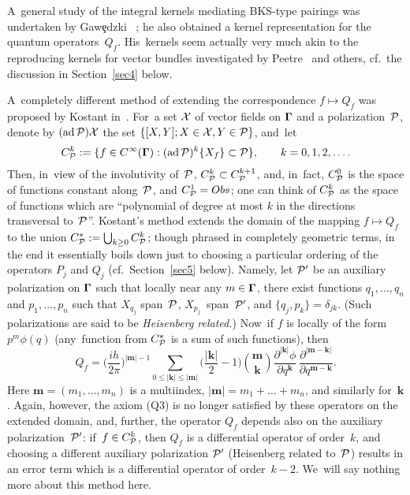\documentclass[11pt]{amsart}
\numberwithin{equation}{section}
\theoremstyle{remark}
\let\boldkey\mathbf \let\bold\mathbf
\newcommand\Obs{Obs}
\newcommand\Omg{{\bigam}}   %
\newcommand\XXX{{\Cal X}}     \newcommand\xX{\XXX}
\newcommand\PP{{\Cal P}}
\newcommand\GG{{\PP'}}
\newcommand\ad{\operatorname{ad}}
\newcommand{\bigam}{\mbox{\boldmath $\Gamma$}}
\begin{document}
A~general study of the integral kernels mediating BKS-type pairings was
undertaken by Gaw\c{e}dzki \cite{bib:GaweD}~\cite{bib:GaweGSPM}; he also
obtained a kernel representation for the quantum operators~$Q_f$. His~kernels
seem actually very much akin to the reproducing kernels for vector bundles
investigated by Peetre~\cite{bib:Pee} and others, cf.~the discussion in
Section~\ref{sec4} below.

A~completely different method of extending the correspondence $f\mapsto Q_f$
was proposed by Kostant in~\cite{bib:KostSymp}. For~a set $\XXX$ of vector
fields on $\Omg$ and a polarization~$\PP$, denote by $(\ad\PP)\XXX$ the set
$\{[X,Y]; X\in\XXX, Y\in\PP\}$, and~let
$$ C_\PP^k := \{ f\in C^\infty(\Omg): (\ad\PP)^k\{X_f\}\subset\PP\},
\qquad k=0,1,2,\dots.   $$
Then, in~view of the involutivity of~$\PP$, $C^k_\PP\subset C^{k+1}_\PP$, and,
in~fact, $C^0_\PP$ is the space of functions constant along~$\PP$, and
$C^1_\PP=\Obs$; one can think of $C^k_\PP$ as the space of functions which are
``polynomial of degree at most $k$ in the directions transversal to~$\PP$''.
Kostant's method extends the domain of the mapping $f\mapsto Q_f$ to the union
$C^*_\PP:= \bigcup_{k\ge0} C^k_\PP$; though phrased in completely geometric
terms, in the end it essentially boils down just to choosing a particular
ordering of the operators $P_j$ and $Q_j$ (cf.~Section~\ref{sec5} below).
Namely, let $\GG$ be an auxiliary polarization on $\Omg$ such that locally near
any $m\in \Omg$, there exist functions $q_1,\dots,q_n$ and $p_1,\dots,p_n$ such
that $X_{q_j}$ span~$\PP$, $X_{p_j}$~span~$\GG$, and $\{q_j,p_k\}=\delta_{jk}$.
(Such polarizations are said to be {\sl Heisenberg related.\/}) Now~if $f$ is
locally of the form $p^m \phi(q)$ (any~function from $C^*_\PP$ is a sum of such
functions), then
$$ Q_f = \bigg(\frac{ih}{2\pi}\bigg)^{|\boldkey m|-1} \sum_{0\le|\boldkey k|\le
|\boldkey m|} \bigg(\frac{|\boldkey k|}2-1\bigg) \binom{\boldkey m}{\boldkey k}
\frac{\partial^{|\boldkey k|}\phi} {\partial q^{\boldkey k}} \, \frac
{\partial^{|\boldkey m-\boldkey k|}}{\partial q^{\boldkey m-\boldkey k}}.  $$
Here $\boldkey m=(m_1,\dots,m_n)$ is a multiindex, $|\boldkey m|=m_1+\dots+
m_n$, and similarly for~$\boldkey k$. Again, however, the axiom (Q3) is no
longer satisfied by these operators on the extended domain, and, further, the
operator $Q_f$ depends also on the auxiliary polarization~$\GG$: if~$f\in
C^k_\PP$, then $Q_f$ is a differential operator of order~$k$, and choosing a
different auxiliary polarization $\GG$ (Heisenberg related to~$\PP$) results in
an error term which is a differential operator of order~$k-2$. We~will say
nothing more about this method here.
\end{document}
